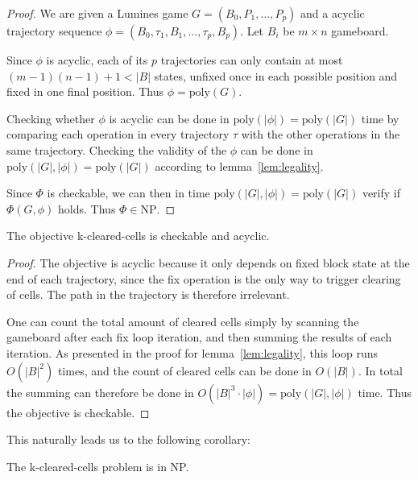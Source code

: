 \begin{proof}
We are given a Lumines game $G = (B_0, P_1, \ldots, P_p)$ and a acyclic trajectory sequence $\phi = (B_0, \tau_1, B_1, \ldots ,\tau_p, B_p)$. Let $B_i$ be $m \times n$ gameboard.

Since $\phi$ is acyclic, each of its $p$ trajectories can only contain at most $(m-1)(n-1) + 1 < |B|$ states, unfixed once in each possible position and fixed in one final position. Thus $\phi = \text{poly}(G)$.

Checking whether $\phi$ is acyclic can be done in $\text{poly}(|\phi|) = \text{poly}(|G|)$ time by comparing each operation in every trajectory $\tau$ with the other operations in the same trajectory. Checking the validity of the $\phi$ can be done in $\text{poly}(|G|, |\phi|) = \text{poly}(|G|)$ according to lemma~\ref{lem:legality}.

Since $\Phi$ is checkable, we can then in time $\text{poly}(|G|, |\phi|) = \text{poly}(|G|)$ verify if $\Phi(G, \phi)$ holds. Thus $\Phi \in \text{NP}$.
\end{proof}

\begin{lem}
The objective k-cleared-cells is checkable and acyclic.
\end{lem}

\begin{proof}
The objective is acyclic because it only depends on fixed block state at the end of each trajectory, since the fix operation is the only way to trigger clearing of cells. The path in the trajectory is therefore irrelevant. 

One can count the total amount of cleared cells simply by scanning the gameboard after each fix loop iteration, and then summing the results of each iteration. As presented in the proof for lemma~\ref{lem:legality}, this loop runs $O(|B|^2)$ times, and the count of cleared cells can be done in $O(|B|)$. In total the summing can therefore be done in $O(|B|^3 \cdot |\phi|) = \text{poly}(|G|, |\phi|)$ time. Thus the objective is checkable.
\end{proof}

This naturally leads us to the following corollary:\\

\begin{cor}
The k-cleared-cells problem is in NP.
\end{cor}
